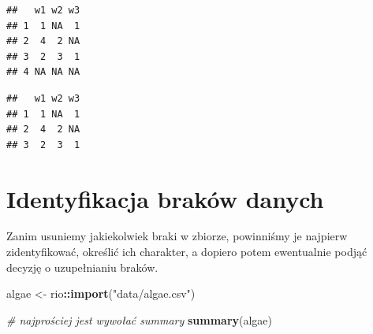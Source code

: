 \documentclass[
]{book}
\newenvironment{Shaded}{\begin{snugshade}}{\end{snugshade}}
\newcommand{\CommentTok}[1]{\textcolor[rgb]{0.56,0.35,0.01}{\textit{#1}}}
\newcommand{\KeywordTok}[1]{\textcolor[rgb]{0.13,0.29,0.53}{\textbf{#1}}}
\newcommand{\NormalTok}[1]{#1}
\newcommand{\OperatorTok}[1]{\textcolor[rgb]{0.81,0.36,0.00}{\textbf{#1}}}
\newcommand{\StringTok}[1]{\textcolor[rgb]{0.31,0.60,0.02}{#1}}
\theoremstyle{plain}
\theoremstyle{definition}
\theoremstyle{definition}
\theoremstyle{definition}
\theoremstyle{definition}
\theoremstyle{remark}
\begin{document}
\begin{verbatim}
##   w1 w2 w3
## 1  1 NA  1
## 2  4  2 NA
## 3  2  3  1
## 4 NA NA NA
\end{verbatim}

\begin{Shaded}
\end{Shaded}

\begin{verbatim}
##   w1 w2 w3
## 1  1 NA  1
## 2  4  2 NA
## 3  2  3  1
\end{verbatim}

\hypertarget{identyfikacja-brakuxf3w-danych}{%
\section{Identyfikacja braków danych}\label{identyfikacja-brakuxf3w-danych}}

Zanim usuniemy jakiekolwiek braki w zbiorze, powinniśmy je najpierw zidentyfikować, określić ich charakter, a dopiero potem ewentualnie podjąć decyzję o uzupełnianiu braków.

\begin{Shaded}
\begin{Highlighting}[]
\NormalTok{algae <-}\StringTok{ }\NormalTok{rio}\OperatorTok{::}\KeywordTok{import}\NormalTok{(}\StringTok{"data/algae.csv"}\NormalTok{)}

\CommentTok{# najprościej jest wywołać summary}
\KeywordTok{summary}\NormalTok{(algae)}
\end{Highlighting}
\end{Shaded}
\end{document}
